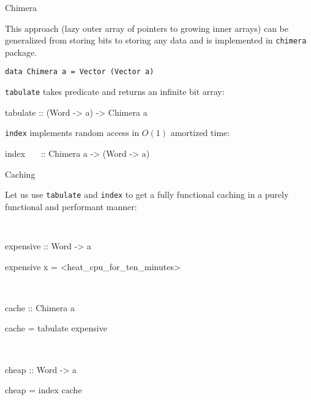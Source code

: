 \documentclass[handout]{beamer}
\begin{document}
\begin{frame}{Chimera}

This approach (lazy outer array of pointers to growing inner arrays)
can be generalized from storing bits to storing any data \pause and
is implemented in {\tt chimera} package.

\bigskip

{\tt data Chimera a = Vector (Vector a)}

\bigskip

\pause

{\tt tabulate} takes predicate and returns an infinite bit array:

\bigskip

{\tt \par tabulate :: (Word -> a) -> Chimera a}

\bigskip

\pause

{\tt index} implements random access in $O(1)$ amortized time:

\bigskip

{\tt \par index~~~ :: Chimera a -> (Word -> a)}

\end{frame}

\begin{frame}{Caching}

Let us use {\tt tabulate} and {\tt index} to get a fully functional caching
in a purely functional and performant manner:

\bigskip

{\tt
\par expensive :: Word -> a
\par expensive x = <heat\_cpu\_for\_ten\_minutes>
\par ~
\par cache :: Chimera a
\par cache = tabulate expensive
\par ~
\par cheap :: Word -> a
\par cheap = index cache
}

\end{frame}
\end{document}
